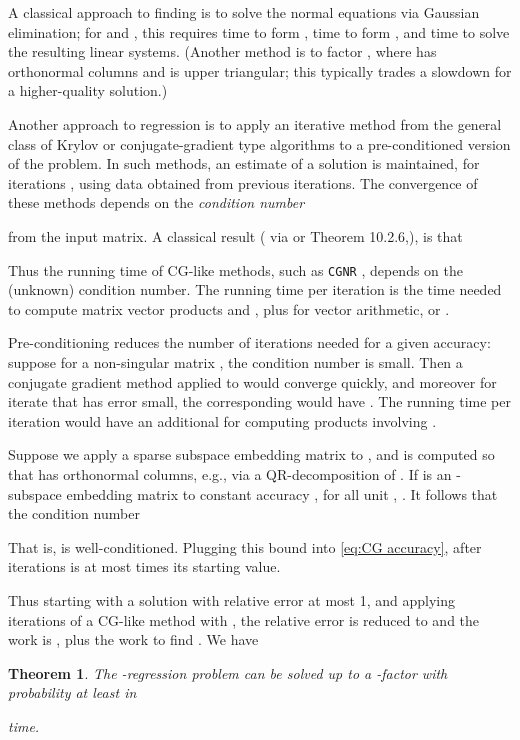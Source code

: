 \documentclass[11pt]{article}
\newtheorem{theorem}{Theorem}
\begin{document}
A classical approach to finding 
is to solve the normal equations 
 via Gaussian elimination;
for  and ,
this requires  time to
form ,  time to form ,
and  time to solve the resulting linear systems.
(Another method is to factor ,
where  has orthonormal columns and  is
upper triangular; this typically trades a slowdown for a higher-quality solution.)

Another approach to regression is to apply an iterative method
from the general class of Krylov or conjugate-gradient type algorithms to a 
pre-conditioned version of the problem. In such methods,
an estimate  of a solution is maintained,
for iterations ,
using data obtained from previous iterations.
The convergence of these methods depends
on the \emph{condition number}

from the input matrix.
A classical result (\cite{Luen} via \cite{MSM} or Theorem 10.2.6,\cite{GvL}),
is that

Thus the running time of CG-like methods, such as {\tt CGNR} \cite{GvL},
depends on the (unknown)
condition number. The running time per iteration is the time needed
to compute matrix vector products  and ,
plus  for vector arithmetic, or .

Pre-conditioning reduces the number of iterations needed for a given accuracy:
suppose
for a non-singular matrix , the condition number 
is small. Then a conjugate gradient method applied to  would converge quickly,
and moreover for iterate  that has error 
small, the corresponding  would have .
The running time per iteration would have an
additional  for computing products involving .

Suppose we apply a sparse subspace embedding matrix 
to , and  is computed so that   has
orthonormal columns, e.g., via a QR-decomposition of . 
If  is an -subspace
embedding matrix to constant accuracy ,
for all unit ,
.
It follows that the condition number

That is,  is well-conditioned. Plugging this
bound into \eqref{eq:CG accuracy}, after  iterations
 is at most 
times its starting value.

Thus starting with a solution  with 
relative error at most 1, and applying  iterations
of a CG-like method with , the relative error is reduced to 
and the work is , 
plus the work to find . We have

\begin{theorem}\label{thm:it reg}
The -regression problem can be solved up to a -factor with probability at least 
 in

time.
\end{theorem}
\end{document}
